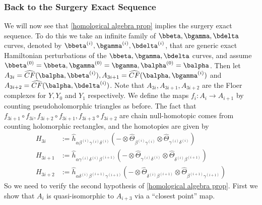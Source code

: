 \subsubsection*{Back to the Surgery Exact Sequence}

We will now see that \cref{homological algebra prop} implies the surgery exact sequence. To do this we take an infinite family of $\bbeta,\bgamma,\bdelta$ curves, denoted by $\bbeta^{(i)},\bgamma^{(i)},\bdelta^{(i)}$, that are generic exact Hamiltonian perturbations of the $\bbeta,\bgamma,\bdelta$ curves, and assume $\bbeta^{(0)}=\bbeta,\bgamma^{(0)}=\bgamma,\balpha^{(0)}=\balpha$. Then let $A_{3i}=\widehat{CF}(\balpha,\bbeta^{(i)}),A_{3i+1}=\widehat{CF}(\balpha,\bgamma^{(i)})$ and $A_{3i+2}=\widehat{CF}(\balpha,\bdelta^{(i)})$. Note that $A_{3i},A_{3i+1},A_{3i+2}$ are the Floer complexes for $Y,Y_0$ and $Y_1$ respectively. We define the maps $f_i : A_i \rightarrow A_{i+1}$ by counting pseudoholomorphic triangles as before. The fact that $f_{3i+1} \circ f_{3i}, f_{3i+2} \circ f_{3i+1},f_{3i+3} \circ f_{3i+2}$ are chain null-homotopic comes from counting holomorphic rectangles, and the homotopies are given by
\begin{align*}
H_{3i} &:= \widehat{h}_{\alpha\beta^{(i)}\gamma^{(i)}\delta^{(i)}}(- \otimes \widehat{\Theta}_{\beta^{(i)}\gamma^{(i)}} \otimes \widehat{\Theta}_{\gamma^{(i)}\delta^{(i)}}) \\
H_{3i+1} &:= \widehat{h}_{\alpha\gamma^{(i)}\delta^{(i)}\beta^{(i+1)}}(- \otimes \widehat{\Theta}_{\gamma^{(i)}\delta^{(i)}} \otimes \widehat{\Theta}_{\delta^{(i)}\beta^{(i+1)}})  \\
H_{3i+2} &:= \widehat{h}_{\alpha\delta^{(i)}\beta^{(i+1)}\gamma^{(i+1)}}(- \otimes \widehat{\Theta}_{\delta^{(i)}\beta^{(i+1)}} \otimes \widehat{\Theta}_{\beta^{(i+1)}\gamma^{(i+1)}})
\end{align*}
So we need to verify the second hypothesis of \cref{homological algebra prop}. First we show that $A_i$ is quasi-isomorphic to $A_{i+3}$ via a ``closest point'' map. 


